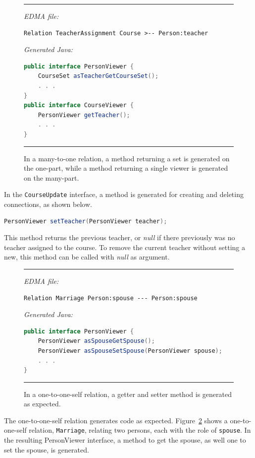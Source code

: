 \begin{figure}[h]
\rule{\textwidth}{0.1mm}
\emph{EDMA file:}
\begin{lstlisting}[language=edma,frame=l]
Relation TeacherAssignment Course >-- Person:teacher
\end{lstlisting}
\emph{Generated Java:}
\begin{lstlisting}[language=java,frame=l]
public interface PersonViewer {
	CourseSet asTeacherGetCourseSet();
	. . .
}
public interface CourseViewer {
	PersonViewer getTeacher();
	. . .
}
\end{lstlisting}
\rule{\textwidth}{0.1mm}
\caption{In a many-to-one relation, a method returning a set is generated on the one-part, while a method returning a single viewer is generated on the many-part.}
\label{fig:generatorRelationsManyOne}
\end{figure}In the \texttt{CourseUpdate} interface, a method is generated for
creating and deleting connections, as shown below.\begin{lstlisting}[language=java,frame=l]
PersonViewer setTeacher(PersonViewer teacher);
\end{lstlisting}This method returns the previous teacher, or \emph{null} if there
previously was no teacher assigned to the course. To remove the current
teacher without setting a new, this method can be called with \emph{null}
as argument.

\begin{figure}[h!]
\rule{\textwidth}{0.1mm}
\emph{EDMA file:}
\begin{lstlisting}[language=edma,frame=none]
Relation Marriage Person:spouse --- Person:spouse
\end{lstlisting}
\emph{Generated Java:}
\begin{lstlisting}[language=java,frame=none]
public interface PersonViewer {
	PersonViewer asSpouseGetSpouse();
	PersonViewer asSpouseSetSpouse(PersonViewer spouse);
	. . . 
}
\end{lstlisting}
\rule{\textwidth}{0.1mm}
\caption{In a one-to-one-self relation, a getter and setter method is generated as expected.}
\label{fig:generatorRelationsOneToOneSelf}
\end{figure}The one-to-one-self relation generates code as expected. Figure~\ref{fig:generatorRelationsOneToOneSelf}
shows a one-to-one-self relation, \texttt{Marriage}, relating two
persons, each with the role of \texttt{spouse}. In the resulting PersonViewer
interface, a method to get the spouse, as well one to set the spouse,
is generated.


